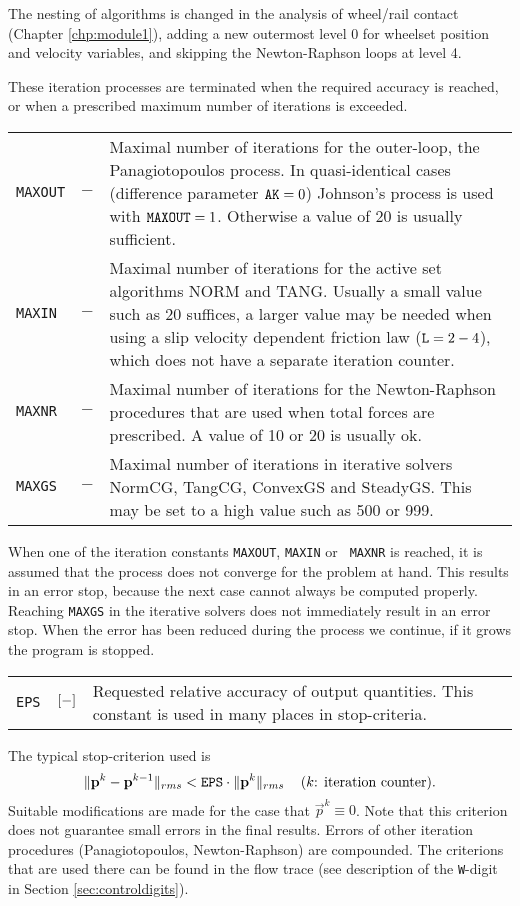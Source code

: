 \documentclass[12pt]{report}
\newenvironment{inputvars}{\vspace{0.4\baselineskip}%

\begin{tabular}{>{\raggedright}p{22mm}p{19mm}p{113mm}}}{
\end{tabular}

}
\newcommand{\inpvar}[3]{{\small\tt #1} & $#2$ & #3 \\[1ex]}
\begin{document}
The nesting of algorithms is changed in the analysis of wheel/rail
contact (Chapter \ref{chp:module1}), adding a new outermost level 0 for
wheelset position and velocity variables, and skipping the Newton-Raphson
loops at level 4.

These iteration processes are terminated when the required accuracy is
reached, or when a prescribed maximum number of iterations is exceeded.
\begin{inputvars}
\inpvar{MAXOUT}{-}{Maximal number of iterations for the outer-loop, the
        Panagiotopoulos process. In quasi-identical cases (difference
        parameter ${\tt AK}=0$) Johnson's process is used with ${\tt MAXOUT}=1$.
        Otherwise a value of 20 is usually sufficient.}
\inpvar{MAXIN}{-}{Maximal number of iterations for the active set
        algorithms NORM and TANG. Usually a small value such as 20 suffices,
        a larger value may be needed when using a slip velocity dependent
        friction law (${\tt L}=2-4$), which does not have a separate
        iteration counter.}
\inpvar{MAXNR}{-}{Maximal number of iterations for the Newton-Raphson
        procedures that are used when total forces are prescribed. A value
        of 10 or 20 is usually ok.}
\inpvar{MAXGS}{-}{Maximal number of iterations in iterative solvers
        NormCG, Tang\-CG, ConvexGS and SteadyGS. This may be set to a high
        value such as 500 or 999.}
\end{inputvars}
When one of the iteration constants {\tt MAXOUT}, {\tt MAXIN} or {\tt
MAXNR} is reached, it is assumed that the process does not converge for
the problem at hand. This results in an error stop, because the next case
cannot always be computed properly. Reaching {\tt MAXGS} in the iterative
solvers does not immediately result in an error stop. When the error has
been reduced during the process we continue, if it grows the program is
stopped.
\begin{inputvars}
\inpvar{EPS}{\bunit{-}}{Requested relative accuracy of output quantities. This
        constant is used in many places in stop-criteria.}
\end{inputvars}
The typical stop-criterion used is
\begin{equation}
  \| \vec{p}^{k} - \vec{p}^{k-1} \|_{rms} <
                {\tt EPS} \cdot \| \vec{p}^k \|_{rms}
        \;\;\; \mbox{ ($k$: iteration counter).}
\end{equation}
Suitable modifications are made for the case that $\vec{p}^k\equiv 0$. Note that
this criterion does not guarantee small errors in the final results. Errors
of other iteration procedures (Panagiotopoulos, Newton-Raphson) are compounded.
The criterions that are used there can be found in the flow trace (see
description of the {\tt W}-digit in Section \ref{sec:controldigits}).
\end{document}
